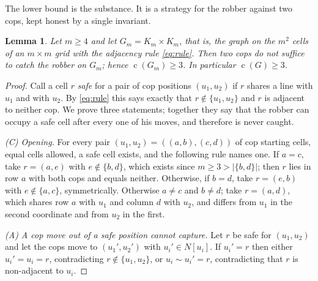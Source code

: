 \documentclass[11pt]{amsart}
\newtheorem{lemma}[theorem]{Lemma}
\theoremstyle{definition}
\DeclareMathOperator{\cop}{c}
\newcommand{\Gwit}{G}
\begin{document}
The lower bound is the substance. It is a strategy for the robber against two
cops, kept honest by a single invariant.

\begin{lemma}\label{lem:lower}
Let $m\ge4$ and let $\Gwit_m=K_m\times K_m$, that is, the graph on the $m^2$
cells of an $m\times m$ grid with the adjacency rule \eqref{eq:rule}. Then two
cops do not suffice to catch the robber on $\Gwit_m$; hence
$\cop(\Gwit_m)\ge3$. In particular $\cop(\Gwit)\ge3$.
\end{lemma}

\begin{proof}
Call a cell $r$ \emph{safe} for a pair of cop positions $(u_1,u_2)$ if $r$
shares a line with $u_1$ and with $u_2$. By \eqref{eq:rule} this says exactly
that $r\notin\{u_1,u_2\}$ and $r$ is adjacent to neither cop. We prove three
statements; together they say that the robber can occupy a safe cell after
every one of his moves, and therefore is never caught.

\smallskip
\noindent\emph{(C) Opening.} For every pair $(u_1,u_2)=((a,b),(c,d))$ of cop
starting cells, equal cells allowed, a safe cell exists, and the following rule
names one. If $a=c$, take $r=(a,e)$ with $e\notin\{b,d\}$, which exists since
$m\ge3>|\{b,d\}|$; then $r$ lies in row $a$ with both cops and equals neither.
Otherwise, if $b=d$, take $r=(e,b)$ with $e\notin\{a,c\}$, symmetrically.
Otherwise $a\neq c$ and $b\neq d$; take $r=(a,d)$, which shares row $a$ with
$u_1$ and column $d$ with $u_2$, and differs from $u_1$ in the second
coordinate and from $u_2$ in the first.

\smallskip
\noindent\emph{(A) A cop move out of a safe position cannot capture.} Let $r$
be safe for $(u_1,u_2)$ and let the cops move to $(u_1',u_2')$ with
$u_i'\in N[u_i]$. If $u_i'=r$ then either $u_i'=u_i=r$, contradicting
$r\notin\{u_1,u_2\}$, or $u_i\sim u_i'=r$, contradicting that $r$ is
non-adjacent to $u_i$.


\end{proof}
\end{document}
